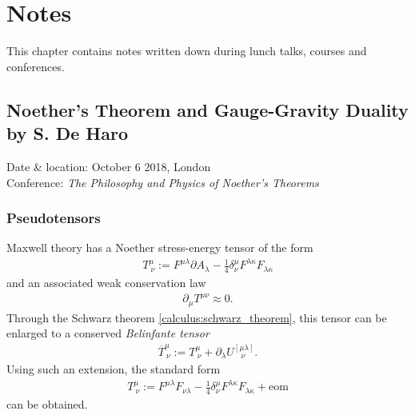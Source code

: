 \chapter{Notes}

    This chapter contains notes written down during lunch talks, courses and conferences.

\section{Noether's Theorem and Gauge-Gravity Duality by S. De Haro}

    Date \& location: October 6 2018, London\\
    Conference: \textit{The Philosophy and Physics of Noether's Theorems}

\subsection{Pseudotensors}

    Maxwell theory has a Noether stress-energy tensor of the form
    \begin{gather}
        T^\mu_{\ \nu} := F^{\mu\lambda}\partial A_\lambda - \frac{1}{4}\delta^\mu_\nu F^{\lambda\kappa}F_{\lambda\kappa}
    \end{gather}
    and an associated weak conservation law
    \begin{gather}
        \partial_\mu T^{\mu\nu}\approx 0.
    \end{gather}
    Through the Schwarz theorem \ref{calculus:schwarz_theorem}, this tensor can be enlarged to a conserved \textit{Belinfante tensor}
    \begin{gather}
        \overline{T}^\mu_{\ \nu} := T^\mu_{\ \nu} + \partial_\lambda U^{[\mu\lambda]}_{\ \ \ \ \nu}.
    \end{gather}
    Using such an extension, the standard form
    \begin{gather}
        T^\mu_{\ \nu} := F^{\mu\lambda}F_{\nu\lambda} - \frac{1}{4}\delta^\mu_\nu F^{\lambda\kappa}F_{\lambda\kappa} + \text{eom}
    \end{gather}
    can be obtained.

